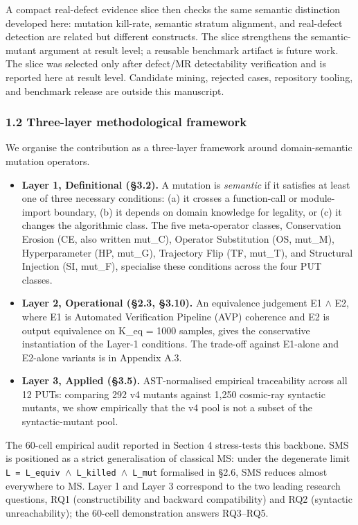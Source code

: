 \documentclass[review,12pt,authoryear]{elsarticle}
\providecommand{\tightlist}{\setlength{\itemsep}{0pt}\setlength{\parskip}{0pt}}
\begin{document}
A compact real-defect evidence slice then checks the same semantic
distinction developed here: mutation kill-rate, semantic stratum
alignment, and real-defect detection are related but different
constructs. The slice strengthens the semantic-mutant argument at result
level; a reusable benchmark artifact is future work. The slice was
selected only after defect/MR detectability verification and is reported
here at result level. Candidate mining, rejected cases, repository
tooling, and benchmark release are outside this manuscript.

\subsubsection{1.2 Three-layer methodological framework}\label{three-layer-methodological-framework}

We organise the contribution as a three-layer framework around
domain-semantic mutation operators.

\begin{itemize}
\tightlist
\item
  \textbf{Layer 1, Definitional (§3.2).} A mutation is \emph{semantic}
  if it satisfies at least one of three necessary conditions: (a) it
  crosses a function-call or module-import boundary, (b) it depends on
  domain knowledge for legality, or (c) it changes the algorithmic
  class. The five meta-operator classes, Conservation Erosion (CE, also
  written mut\_C), Operator Substitution (OS, mut\_M), Hyperparameter
  (HP, mut\_G), Trajectory Flip (TF, mut\_T), and Structural Injection
  (SI, mut\_F), specialise these conditions across the four PUT classes.
\item
  \textbf{Layer 2, Operational (§2.3, §3.10).} An equivalence judgement
  E1 $\wedge$ E2, where E1 is Automated Verification Pipeline (AVP) coherence
  and E2 is output equivalence on K\_eq = 1000 samples, gives the
  conservative instantiation of the Layer-1 conditions. The trade-off
  against E1-alone and E2-alone variants is in Appendix A.3.
\item
  \textbf{Layer 3, Applied (§3.5).} AST-normalised empirical
  traceability across all 12 PUTs: comparing 292 v4 mutants against
  1,250 cosmic-ray syntactic mutants, we show empirically that the v4
  pool is not a subset of the syntactic-mutant pool.
\end{itemize}

The 60-cell empirical audit reported in Section 4 stress-tests this
backbone. SMS is positioned as a strict generalisation of classical MS:
under the
degenerate limit \texttt{L\ =\ L\_equiv\ $\wedge$\ L\_killed\ $\wedge$\ L\_mut}
formalised in §2.6, SMS reduces almost everywhere to MS. Layer 1 and
Layer 3 correspond to the two leading research questions, RQ1
(constructibility and backward compatibility) and RQ2 (syntactic
unreachability); the 60-cell demonstration answers RQ3--RQ5.
\end{document}
